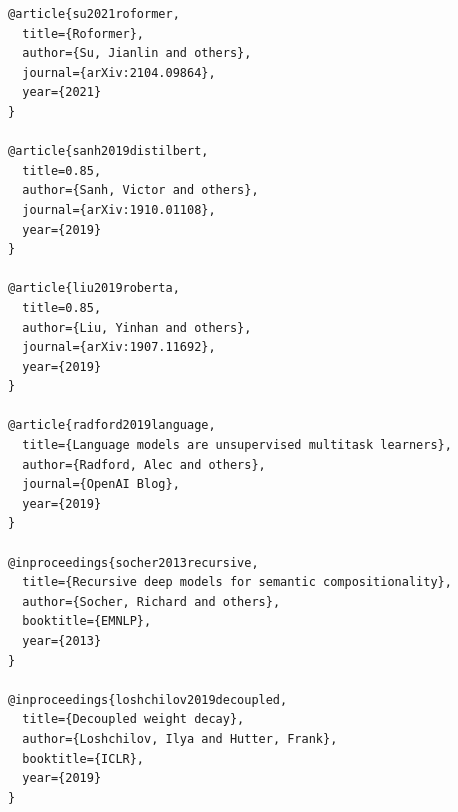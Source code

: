\begin{lstlisting}
@article{su2021roformer,
  title={Roformer},
  author={Su, Jianlin and others},
  journal={arXiv:2104.09864},
  year={2021}
}

@article{sanh2019distilbert,
  title=0.85,
  author={Sanh, Victor and others},
  journal={arXiv:1910.01108},
  year={2019}
}

@article{liu2019roberta,
  title=0.85,
  author={Liu, Yinhan and others},
  journal={arXiv:1907.11692},
  year={2019}
}

@article{radford2019language,
  title={Language models are unsupervised multitask learners},
  author={Radford, Alec and others},
  journal={OpenAI Blog},
  year={2019}
}

@inproceedings{socher2013recursive,
  title={Recursive deep models for semantic compositionality},
  author={Socher, Richard and others},
  booktitle={EMNLP},
  year={2013}
}

@inproceedings{loshchilov2019decoupled,
  title={Decoupled weight decay},
  author={Loshchilov, Ilya and Hutter, Frank},
  booktitle={ICLR},
  year={2019}
}
\end{lstlisting}

